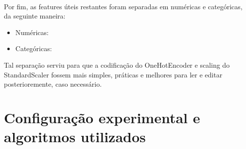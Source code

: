 \documentclass{article}
\begin{document}
\\
Por fim, as features úteis restantes foram separadas em numéricas e categóricas, da seguinte maneira:
\begin{itemize}
    \item Numéricas:
    \item Categóricas:
\end{itemize}

Tal separação serviu para que a codificação do OneHotEncoder e scaling do StandardScaler fossem mais simples, práticas e melhores para ler e editar posterioremente, caso necessário. 
    
\section{Configuração experimental e algoritmos utilizados}

\end{document}
